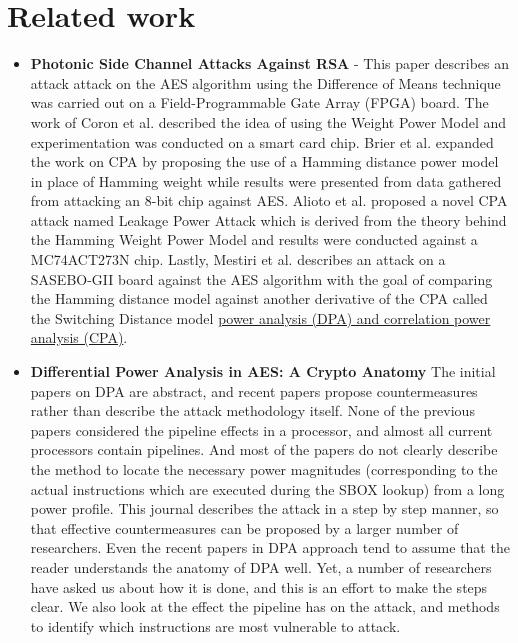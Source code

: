     \section{Related work} \label{sec:RelatedWork}
    \begin{itemize}
    \item \textbf{Photonic Side Channel Attacks Against RSA} - This paper describes an attack attack on the AES algorithm using the Difference of Means technique was carried out on a Field-Programmable Gate Array (FPGA) board.
     The work of Coron et al. described the idea of using the Weight Power Model and experimentation was conducted on a smart card chip. Brier et al. expanded the work on CPA by proposing the use of a Hamming distance power model in place of Hamming weight while results were presented from data gathered from attacking an 8-bit chip against AES.
     Alioto et al. proposed a novel CPA attack named Leakage Power Attack which is derived from the theory behind the Hamming Weight Power Model and results were conducted against a MC74ACT273N chip.
     Lastly, Mestiri et al. describes an attack on a SASEBO-GII board against the AES algorithm with the goal of comparing the Hamming distance model against another derivative of the CPA called the Switching Distance model
    \href{https://doi.org/10.1080/23742917.2016.1231523}{power analysis (DPA) and correlation power analysis (CPA)}.

    \item  \textbf{Differential Power Analysis in AES: A Crypto Anatomy} 
    The  initial  papers  on  DPA  are  abstract,  and  recent  papers  propose countermeasures  rather  than  describe  the  attack  methodology  itself.
    None  of  the  previous  papers considered the pipeline effects in a processor, and almost all current processors contain pipelines. 
    And most  of  the papers  do  not clearly  describe  the method  to  locate the  necessary power  magnitudes (corresponding to  the actual instructions which  are executed during  the SBOX lookup) from a long power profile.  
    This journal describes the attack in a step by step manner, so that effective countermeasures can be proposed by a larger number of researchers. 
    Even the recent papers in DPA approach tend to assume that the reader understands the anatomy of DPA well.
    Yet, a number of researchers have asked us about how it is done, and this is an effort to  make the steps clear. 
    We also look at the effect the pipeline has on the attack, and methods to identify which instructions are most vulnerable to attack.


\end{itemize}
